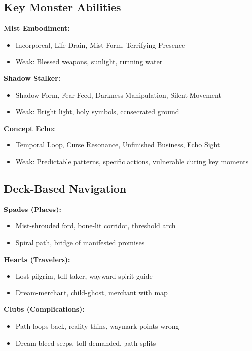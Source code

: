 \documentclass[11pt]{article}
\begin{document}
\subsection*{Key Monster Abilities}

\textbf{Mist Embodiment:}
\begin{itemize}
\item Incorporeal, Life Drain, Mist Form, Terrifying Presence
\item Weak: Blessed weapons, sunlight, running water
\end{itemize}

\textbf{Shadow Stalker:}
\begin{itemize}
\item Shadow Form, Fear Feed, Darkness Manipulation, Silent Movement
\item Weak: Bright light, holy symbols, consecrated ground
\end{itemize}

\textbf{Concept Echo:}
\begin{itemize}
\item Temporal Loop, Curse Resonance, Unfinished Business, Echo Sight
\item Weak: Predictable patterns, specific actions, vulnerable during key moments
\end{itemize}

\subsection*{Deck-Based Navigation}

\textbf{Spades (Places):}
\begin{itemize}
\item Mist-shrouded ford, bone-lit corridor, threshold arch
\item Spiral path, bridge of manifested promises
\end{itemize}

\textbf{Hearts (Travelers):}
\begin{itemize}
\item Lost pilgrim, toll-taker, wayward spirit guide
\item Dream-merchant, child-ghost, merchant with map
\end{itemize}

\textbf{Clubs (Complications):}
\begin{itemize}
\item Path loops back, reality thins, waymark points wrong
\item Dream-bleed seeps, toll demanded, path splits
\end{itemize}
\end{document}
